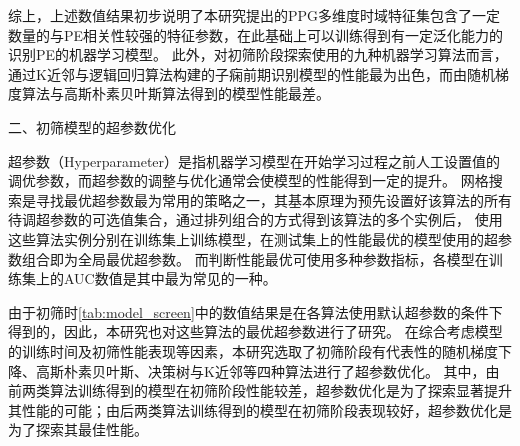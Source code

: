 综上，上述数值结果初步说明了本研究提出的PPG多维度时域特征集包含了一定数量的与PE相关性较强的特征参数，在此基础上可以训练得到有一定泛化能力的识别PE的机器学习模型。
此外，对初筛阶段探索使用的九种机器学习算法而言，通过K近邻与逻辑回归算法构建的子痫前期识别模型的性能最为出色，而由随机梯度算法与高斯朴素贝叶斯算法得到的模型性能最差。

二、初筛模型的超参数优化

超参数（Hyperparameter）是指机器学习模型在开始学习过程之前人工设置值的调优参数\cite{scikit-learn,Aurélien2018}，而超参数的调整与优化通常会使模型的性能得到一定的提升。
网格搜索是寻找最优超参数最为常用的策略之一，其基本原理为预先设置好该算法的所有待调超参数的可选值集合，通过排列组合的方式得到该算法的多个实例后，
使用这些算法实例分别在训练集上训练模型，在测试集上的性能最优的模型使用的超参数组合即为全局最优超参数\cite{Aurélien2018}。
而判断性能最优可使用多种参数指标，各模型在训练集上的AUC数值是其中最为常见的一种。

由于初筛时\autoref{tab:model_screen}中的数值结果是在各算法使用默认超参数的条件下得到的，因此，本研究也对这些算法的最优超参数进行了研究。
在综合考虑模型的训练时间及初筛性能表现等因素，本研究选取了初筛阶段有代表性的随机梯度下降、高斯朴素贝叶斯、决策树与K近邻等四种算法进行了超参数优化。
其中，由前两类算法训练得到的模型在初筛阶段性能较差，超参数优化是为了探索显著提升其性能的可能；由后两类算法训练得到的模型在初筛阶段表现较好，超参数优化是为了探索其最佳性能。

